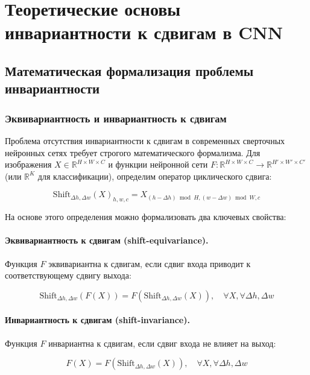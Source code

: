 \section{Теоретические основы инвариантности к сдвигам в CNN}
\label{sec:Chapter3} 

\subsection{Математическая формализация проблемы инвариантности}
\label{sec:math}

\subsubsection{Эквивариантность и инвариантность к сдвигам}

Проблема отсутствия инвариантности к сдвигам в современных сверточных нейронных сетях требует строгого математического формализма. Для изображения $X \in \mathbb{R}^{H \times W \times C}$ и функции нейронной сети $F: \mathbb{R}^{H \times W \times C} \to \mathbb{R}^{H' \times W' \times C'}$ (или $\mathbb{R}^K$ для классификации), определим оператор циклического сдвига:

\begin{equation}
\mathrm{Shift}_{\Delta h, \Delta w}(X)_{h,w,c} = X_{(h-\Delta h) \bmod H, (w-\Delta w) \bmod W, c}
\end{equation}

На основе этого определения можно формализовать два ключевых свойства:

\paragraph{Эквивариантность к сдвигам (shift-equivariance).} Функция $F$ эквивариантна к сдвигам, если сдвиг входа приводит к соответствующему сдвигу выхода:

\begin{equation}
\mathrm{Shift}_{\Delta h, \Delta w}(F(X)) = F(\mathrm{Shift}_{\Delta h, \Delta w}(X)), \quad \forall X, \forall \Delta h, \Delta w
\end{equation}

\paragraph{Инвариантность к сдвигам (shift-invariance).} Функция $F$ инвариантна к сдвигам, если сдвиг входа не влияет на выход:

\begin{equation}
F(X) = F(\mathrm{Shift}_{\Delta h, \Delta w}(X)), \quad \forall X, \forall \Delta h, \Delta w
\end{equation}

